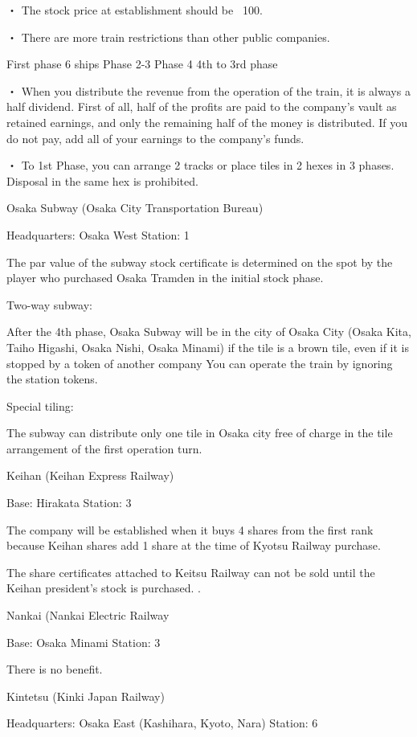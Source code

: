 \documentclass{article}
\begin{document}
\begin{CJK}{UTF8}{min}
・ The stock price at establishment should be \ 100.

・ There are more train restrictions than other public companies.

First phase 6 ships
Phase 2-3 Phase 4
4th to 3rd phase

・ When you distribute the revenue from the operation of the train, it is always a half dividend. First of all, half of the profits are paid to the company's vault as retained earnings, and only the remaining half of the money is distributed. If you do not pay, add all of your earnings to the company's funds.

・ To 1st Phase, you can arrange 2 tracks or place tiles in 2 hexes in 3 phases. Disposal in the same hex is prohibited.

Osaka Subway (Osaka City Transportation Bureau)

Headquarters: Osaka West Station: 1

The par value of the subway stock certificate is determined on the spot by the player who purchased Osaka Tramden in the initial stock phase.

Two-way subway:

After the 4th phase, Osaka Subway will be in the city of Osaka City (Osaka Kita, Taiho Higashi, Osaka Nishi, Osaka Minami) if the tile is a brown tile, even if it is stopped by a token of another company You can operate the train by ignoring the station tokens.

Special tiling:

The subway can distribute only one tile in Osaka city free of charge in the tile arrangement of the first operation turn.

Keihan (Keihan Express Railway)

Base: Hirakata Station: 3

The company will be established when it buys 4 shares from the first rank because Keihan shares add 1 share at the time of Kyotsu Railway purchase.

The share certificates attached to Keitsu Railway can not be sold until the Keihan president's stock is purchased. .

Nankai (Nankai Electric Railway

Base: Osaka Minami Station: 3

There is no benefit.

Kintetsu (Kinki Japan Railway)

Headquarters: Osaka East (Kashihara, Kyoto, Nara) Station: 6


\end{CJK}
\end{document}
